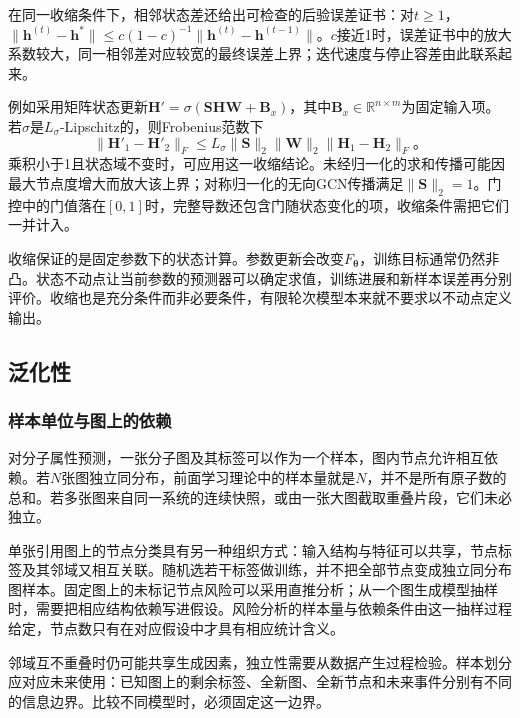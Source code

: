 在同一收缩条件下，相邻状态差还给出可检查的后验误差证书：对$t\geq1$，$\lVert\bm{h}^{(t)}-\bm{h}^*\rVert\leq c(1-c)^{-1}\lVert\bm{h}^{(t)}-\bm{h}^{(t-1)}\rVert$。$c$接近1时，误差证书中的放大系数较大，同一相邻差对应较宽的最终误差上界；迭代速度与停止容差由此联系起来。

例如采用矩阵状态更新$\bm{H}'=\sigma(\bm{S}\bm{H}\bm{W}+\bm{B}_x)$，其中$\bm{B}_x\in\mathbb{R}^{n\times m}$为固定输入项。若$\sigma$是$L_\sigma$-Lipschitz的，则Frobenius范数下
\begin{equation}
  \lVert\bm{H}'_1-\bm{H}'_2\rVert_F
    \leq L_\sigma\lVert\bm{S}\rVert_2\lVert\bm{W}\rVert_2
      \lVert\bm{H}_1-\bm{H}_2\rVert_F\text{。}
  \label{eq:gnn-state-lipschitz}
\end{equation}
乘积小于1且状态域不变时，可应用这一收缩结论。未经归一化的求和传播可能因最大节点度增大而放大该上界；对称归一化的无向GCN传播满足$\lVert\bm{S}\rVert_2=1$。门控中的门值落在$[0,1]$时，完整导数还包含门随状态变化的项，收缩条件需把它们一并计入。

收缩保证的是固定参数下的状态计算。参数更新会改变$F_{\bm{\theta}}$，训练目标通常仍然非凸。状态不动点让当前参数的预测器可以确定求值，训练进展和新样本误差再分别评价。收缩也是充分条件而非必要条件，有限轮次模型本来就不要求以不动点定义输出。

\subsection{泛化性}
\label{sec:gnn-generalization}

\subsubsection{样本单位与图上的依赖}
\label{sec:gnn-sample-units}

对分子属性预测，一张分子图及其标签可以作为一个样本，图内节点允许相互依赖。若$N$张图独立同分布，前面学习理论中的样本量就是$N$，并不是所有原子数的总和。若多张图来自同一系统的连续快照，或由一张大图截取重叠片段，它们未必独立。

单张引用图上的节点分类具有另一种组织方式：输入结构与特征可以共享，节点标签及其邻域又相互关联。随机选若干标签做训练，并不把全部节点变成独立同分布图样本。固定图上的未标记节点风险可以采用直推分析；从一个图生成模型抽样时，需要把相应结构依赖写进假设。风险分析的样本量与依赖条件由这一抽样过程给定，节点数只有在对应假设中才具有相应统计含义。

邻域互不重叠时仍可能共享生成因素，独立性需要从数据产生过程检验。样本划分应对应未来使用：已知图上的剩余标签、全新图、全新节点和未来事件分别有不同的信息边界。比较不同模型时，必须固定这一边界。

